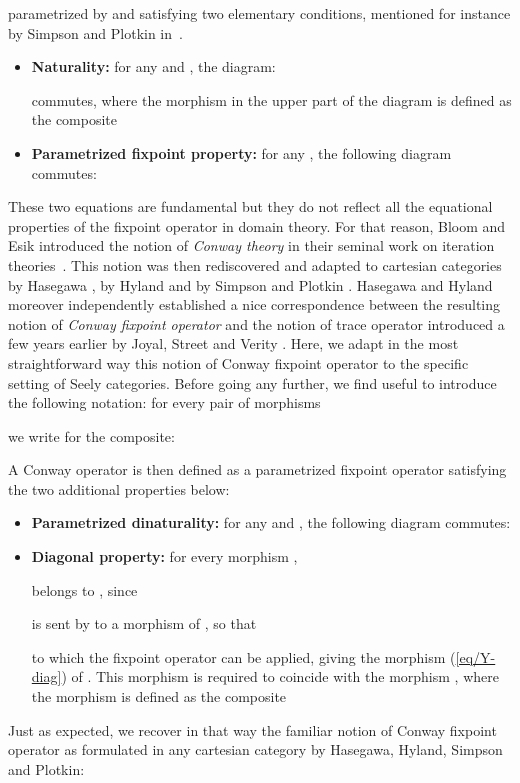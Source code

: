 \documentclass[runningheads,a4paper]{llncs}
\begin{document}
\noindent
parametrized by  and satisfying two elementary conditions,
mentioned for instance by Simpson and Plotkin in~\cite{simpson-plotkin}.
\begin{itemize}
\item \textbf{Naturality:} for any  and , the diagram:



\noindent
commutes, where the morphism  in the upper part of the diagram is defined as the composite



\item \textbf{Parametrized fixpoint property:} for any , the following diagram commutes:



\end{itemize}

These two equations are fundamental but they do not reflect all the equational properties 
of the fixpoint operator in domain theory.
For that reason, Bloom and Esik introduced the notion of \emph{Conway theory}
in their seminal work on iteration theories~\cite{bloom-esik,Bloom19961}.
This notion was then rediscovered and adapted to cartesian categories
by Hasegawa \cite{hasegawa},  by Hyland and by Simpson and Plotkin \cite{simpson-plotkin}.
Hasegawa and Hyland moreover independently established a nice correspondence
between the resulting notion of \emph{Conway fixpoint operator} and 
the notion of trace operator introduced a few years earlier
by Joyal, Street and Verity \cite{joyal-street-verity}.
Here, we adapt in the most straightforward way this notion of Conway fixpoint operator
to the specific setting of Seely categories.
Before going any further, we find useful to introduce the following notation: for every pair of morphisms



\noindent
we write  for the composite:



\noindent
A Conway operator is then defined as a parametrized fixpoint operator satisfying the two additional properties below:
\begin{itemize}
\item \textbf{Parametrized dinaturality:} for any  and , the following diagram commutes:


\item \textbf{Diagonal property:} for every morphism ,



belongs to  , since


is sent by  to a morphism of , so that



to which the fixpoint operator  can be applied, giving the morphism (\ref{eq/Y-diag}) of . This morphism is required to
coincide with the morphism , where the morphism  is defined as the composite

\end{itemize}
\noindent
Just as expected, we recover in that way the familiar notion of Conway fixpoint operator
as formulated in any cartesian category by Hasegawa, Hyland, Simpson and Plotkin:
\end{document}
